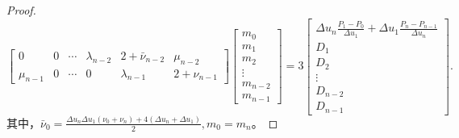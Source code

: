 \documentclass[utf8]{ctexart}
\begin{document}
\begin{proof}
\begin{equation}
\begin{bmatrix}
            0 & 0 & \cdots & \lambda_{n-2} & 2+\bar{\nu}_{n-2} & \mu_{n-2}\\
            \mu_{n-1} & 0 & \cdots & 0 & \lambda_{n-1} & 2+\nu_{n-1}
        \end{bmatrix}
        \begin{bmatrix}
            m_0\\
            m_1\\
            m_2\\
            \vdots\\
            m_{n-2}\\
            m_{n-1}
        \end{bmatrix} = 
        3
        \begin{bmatrix}
            \Delta u_n\frac{P_1-P_0}{\Delta u_1} + \Delta u_1\frac{P_n-P_{n-1}}{\Delta u_{n}}\\
            D_1\\
            D_2\\
            \vdots\\
            D_{n-2}\\
            D_{n-1}
        \end{bmatrix}.
    \end{equation}
    其中，$\bar{\nu}_0=\frac{\Delta u_n\Delta u_1(\nu_0 + \nu_n) + 4(\Delta u_n + \Delta u_1)}{2}, m_0=m_n$。
\end{proof}
\end{document}
